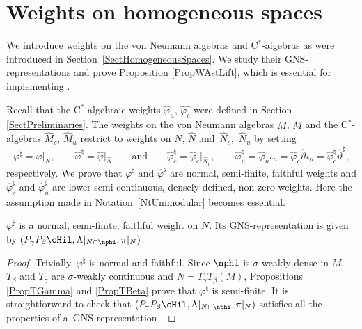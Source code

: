 \section{Weights on homogeneous spaces}\label{SectWeights}

We introduce weights on the von Neumann algebras and C$^\ast$-algebras as were introduced in Section~\ref{SectHomogeneousSpaces}. We study their GNS-representations and prove Proposition \ref{PropWAstLift}, which is essential for implementing \cite[Theorem~3.4.5]{Des}.



Recall that the C$^\ast$-algebraic weights $\hat{\varphi}_u$, $\hat{\varphi_c}$ were def\/ined in  Section \ref{SectPreliminaries}.
The weights on the von Neumann algebras $M$, $\hat{M}$ and the C$^\ast$-algebras $\hat{M}_c$, $\hat{M}_u$ restrict to weights on $N$, $\hat{N}$ and~$\hat{N}_c$,~$\hat{N}_u$ by setting
\[
\varphi^\natural = \varphi \vert _N, \qquad \hat{\varphi}^\natural = \hat{\varphi} \vert_{\hat{N}} \qquad \textrm{and} \qquad \hat{\varphi}_c^\natural = \hat{\varphi}_c\vert_{\hat{N}_c},\qquad \hat{\varphi}_u^\natural = \hat{\varphi}_u \iota_u = \hat{\varphi}_c \hat{\vartheta} \iota_u = \hat{\varphi}_c^\natural \hat{\vartheta}^\natural,
\]
 respectively. We prove that $\varphi^\natural$ and $\hat{\varphi}^\natural$ are normal, semi-f\/inite, faithful weights  and $\hat{\varphi}_c^\natural$ and $\hat{\varphi}_u^\natural$ are lower semi-continuous, densely-def\/ined, non-zero weights. Here the assumption made in Notation~\ref{NtUnimodular} becomes essential.

\begin{prop}\label{PropNormalWeightVNA}
$\varphi^\natural$ is a normal, semi-finite, faithful weight on $N$. Its GNS-representation is given by $(P_\gamma P_\beta \cHil, \Lambda \vert_{N \cap \nphi}, \pi\vert_N)$.
\end{prop}
\begin{proof}
Trivially, $\varphi^\natural$ is normal and faithful. Since $\nphi$ is $\sigma$-weakly dense in $M$, $T_\beta$ and $T_\gamma$ are $\sigma$-weakly continuous and $N = T_\gamma T_\beta(M)$, Propositions \ref{PropTGamma} and \ref{PropTBeta} prove that $\varphi^\natural$ is semi-f\/inite. It is straightforward to check that $(P_\gamma P_\beta \cHil, \Lambda \vert_{N \cap \nphi}, \pi\vert_N)$ satisf\/ies all the properties of a~GNS-representation \cite[Section VII.1]{TakII}.
\end{proof}

